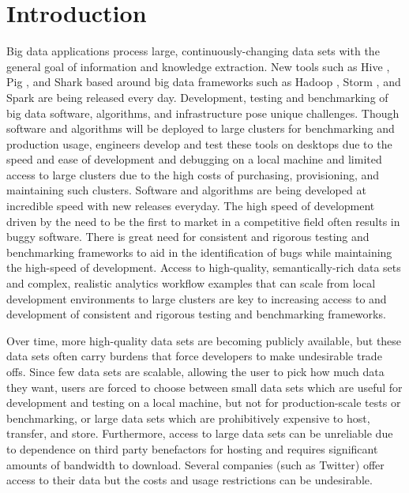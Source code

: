 \documentclass[conference]{IEEEtran}
\begin{document}
\section{Introduction}
Big data applications process large, continuously-changing data sets with the general goal of information and knowledge extraction.  New tools such as Hive \cite{Thusoo2010}, Pig \cite{Olston2008,Gates2009}, and Shark \cite{Engle2012} based around big data frameworks such as Hadoop \cite{Hadoop}, Storm \cite{Storm}, and Spark \cite{Zaharia2010,Zaharia2012} are being released every day. Development, testing and benchmarking of big data software, algorithms, and infrastructure pose unique challenges.  Though software and algorithms will be deployed to large clusters for benchmarking and production usage, engineers develop and test these tools on desktops due to the speed and ease of development and debugging on a local machine and limited access to large clusters due to the high costs of purchasing, provisioning, and maintaining such clusters.  Software and algorithms are being developed at incredible speed with new releases everyday. The high speed of development driven by the need to be the first to market in a competitive field often results in buggy software.  There is great need for consistent and rigorous testing and benchmarking frameworks to aid in the identification of bugs while maintaining the high-speed of development.  Access to high-quality, semantically-rich data sets and complex, realistic analytics workflow examples that can scale from local development environments to large clusters are key to increasing access to and development of consistent and rigorous testing and benchmarking frameworks.

Over time, more high-quality data sets are becoming publicly available, but these data sets often carry burdens that force developers to make undesirable trade offs. Since few data sets are scalable, allowing the user to pick how much data they want, users are forced to choose between small data sets which are useful for development and testing on a local machine, but not for production-scale tests or benchmarking, or large data sets which are prohibitively expensive to host, transfer, and store. Furthermore, access to large data sets can be unreliable due to dependence on third party benefactors for hosting and requires significant amounts of bandwidth to download.  Several companies (such as Twitter\cite{Twitter}) offer access to their data but the costs and usage restrictions can be undesirable.
\end{document}
